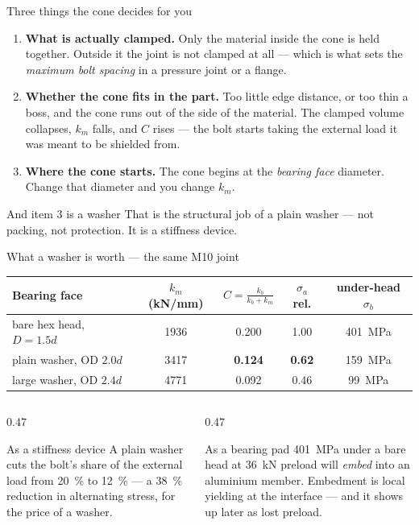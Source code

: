 \documentclass[aspectratio=169,10pt]{beamer}
\begin{document}
\begin{frame}{Three things the cone decides for you}
\begin{enumerate}
  \item \textbf{What is actually clamped.} Only the material inside the cone is held together.
        Outside it the joint is not clamped at all --- which is what sets the \emph{maximum bolt
        spacing} in a pressure joint or a flange.
  \item \textbf{Whether the cone fits in the part.} Too little edge distance, or too thin a boss, and
        the cone runs out of the side of the material. The clamped volume collapses, $k_m$ falls, and
        $C$ rises --- the bolt starts taking the external load it was meant to be shielded from.
  \item \textbf{Where the cone starts.} The cone begins at the \emph{bearing face} diameter. Change
        that diameter and you change $k_m$.
\end{enumerate}
\vfill
\begin{alertblock}{And item 3 is a washer}
That is the structural job of a plain washer --- not packing, not protection. \alert{It is a
stiffness device.}
\end{alertblock}
\end{frame}

\begin{frame}{What a washer is worth --- the same M10 joint}
\centering\small
\begin{tabular}{@{}lcccc@{}}
\toprule
Bearing face & $k_m$ (\si{kN/mm}) & $C=\frac{k_b}{k_b+k_m}$ & $\sigma_a$ rel. & under-head $\sigma_b$\\
\midrule
bare hex head, $D=1.5d$ & 1936 & 0.200 & 1.00 & \SI{401}{MPa}\\
plain washer, OD $2.0d$ & 3417 & \alert{\textbf{0.124}} & \alert{\textbf{0.62}} & \alert{\SI{159}{MPa}}\\
large washer, OD $2.4d$ & 4771 & 0.092 & 0.46 & \SI{99}{MPa}\\
\bottomrule
\end{tabular}
\vfill
\raggedright
\begin{columns}[T]
\begin{column}{0.47\textwidth}
\begin{block}{\small As a stiffness device}
\footnotesize A plain washer cuts the bolt's share of the external load from \SI{20}{\percent} to
\SI{12}{\percent} --- a \SI{38}{\percent} reduction in alternating stress, for the price of a washer.
\end{block}
\end{column}
\begin{column}{0.47\textwidth}
\begin{block}{\small As a bearing pad}
\footnotesize \SI{401}{MPa} under a bare head at \SI{36}{kN} preload will \emph{embed} into an
aluminium member. Embedment is local yielding at the interface --- and it shows up later as
\alert{lost preload}.
\end{block}
\end{column}
\end{columns}
\end{frame}
\end{document}
